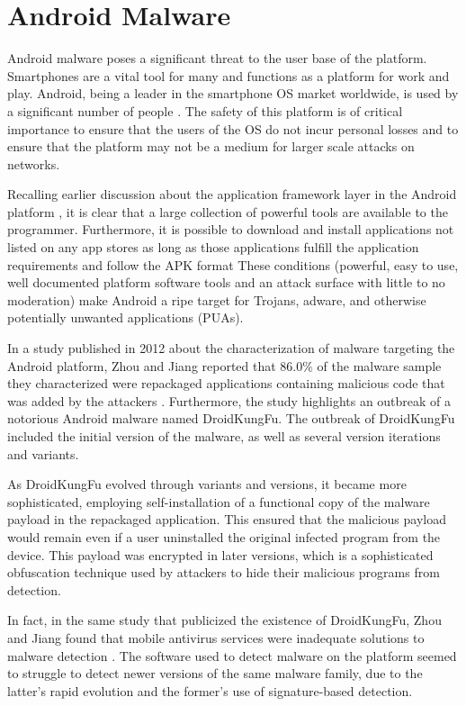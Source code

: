 \section{Android Malware}
Android malware poses a significant threat to the user base of the platform.
Smartphones are a vital tool for many and functions as a platform for work and play.
Android, being a leader in the smartphone OS market worldwide, is used by a significant number of people \cite{AndroidMarketShare2021}.
The safety of this platform is of critical importance to ensure that the users of the OS do not incur personal losses and to ensure that the platform may not be a medium for larger scale attacks on networks.

Recalling earlier discussion about the application framework layer in the Android platform \cite{AndroidDocs2022Arch}, it is clear that a large collection of powerful tools are available to the programmer.
Furthermore, it is possible to download and install applications not listed on any app stores as long as those applications fulfill the application requirements and follow the APK format \cite{AndroidDocs2022Fundamentals}
These conditions (powerful, easy to use, well documented platform software tools and an attack surface with little to no moderation) make Android a ripe target for Trojans, adware, and otherwise potentially unwanted applications (PUAs).

In a study published in 2012 about the characterization of malware targeting the Android platform, Zhou and Jiang reported that 86.0\% of the malware sample they characterized were repackaged applications containing malicious code that was added by the attackers \cite{Zhou2012}.
Furthermore, the study highlights an outbreak of a notorious Android malware named DroidKungFu.
The outbreak of DroidKungFu included the initial version of the malware, as well as several version iterations and variants.

As DroidKungFu evolved through variants and versions, it became more sophisticated, employing self-installation of a functional copy of the malware payload in the repackaged application.
This ensured that the malicious payload would remain even if a user uninstalled the original infected program from the device.
This payload was encrypted in later versions, which is a sophisticated obfuscation technique used by attackers to hide their malicious programs from detection.

In fact, in the same study that publicized the existence of DroidKungFu, Zhou and Jiang found that mobile antivirus services were inadequate solutions to malware detection \cite{Zhou2012}.
The software used to detect malware on the platform seemed to struggle to detect newer versions of the same malware family, due to the latter's rapid evolution and the former's use of signature-based detection.

